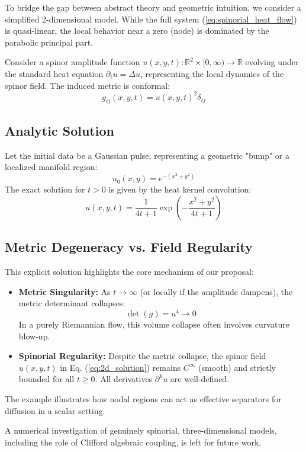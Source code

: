 \documentclass[11pt, reqno, a4paper]{amsart}
\theoremstyle{definition}
\theoremstyle{remark}
\newcommand{\R}{\mathbb{R}}
\begin{document}
To bridge the gap between abstract theory and geometric intuition, we consider a simplified 2-dimensional model. While the full system (\ref{eq:spinorial_heat_flow}) is quasi-linear, the local behavior near a zero (node) is dominated by the parabolic principal part.

Consider a spinor amplitude function $u(x,y,t): \R^2 \times [0, \infty) \to \R$ evolving under the standard heat equation $\partial_t u = \Delta u$, representing the local dynamics of the spinor field. The induced metric is conformal:
\begin{equation}
    g_{ij}(x,y,t) = u(x,y,t)^2 \delta_{ij}
\end{equation}

\subsection{Analytic Solution}
Let the initial data be a Gaussian pulse, representing a geometric "bump" or a localized manifold region:
\[ u_0(x,y) = e^{-(x^2+y^2)} \]
The exact solution for $t > 0$ is given by the heat kernel convolution:
\begin{equation} \label{eq:2d_solution}
    u(x,y,t) = \frac{1}{4t+1} \exp\left( -\frac{x^2+y^2}{4t+1} \right)
\end{equation}

\subsection{Metric Degeneracy vs. Field Regularity}
This explicit solution highlights the core mechanism of our proposal:
\begin{itemize}
    \item \textbf{Metric Singularity:} As $t \to \infty$ (or locally if the amplitude dampens), the metric determinant collapses:
    \[ \det(g) = u^4 \to 0 \]
    In a purely Riemannian flow, this volume collapse often involves curvature blow-up.
    
    \item \textbf{Spinorial Regularity:} Despite the metric collapse, the spinor field $u(x,y,t)$ in Eq. (\ref{eq:2d_solution}) remains $C^\infty$ (smooth) and strictly bounded for all $t \geq 0$. All derivatives $\partial^k u$ are well-defined.
\end{itemize}

The example illustrates how nodal regions can act as effective separators for diffusion in a scalar setting.

A numerical investigation of genuinely spinorial, three-dimensional models, including the role of Clifford algebraic coupling, is left for future work.
\end{document}
